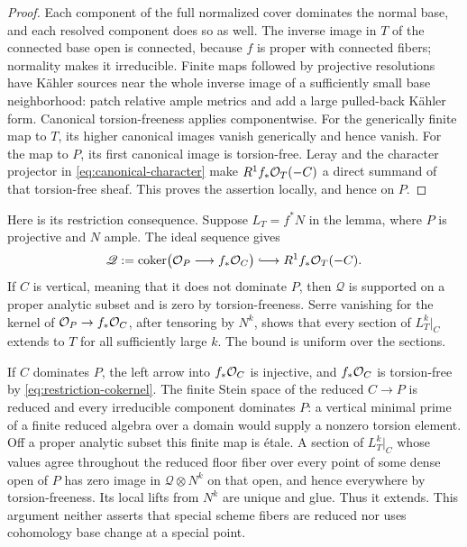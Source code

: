 \begin{proof}
Each component of the full normalized cover dominates the normal base,
and each resolved component does so as well.  The inverse image in \(T\)
of the connected base open is connected, because \(f\) is proper with
connected fibers; normality makes it irreducible.  Finite maps followed by
projective resolutions have K\"ahler sources near the whole inverse image
of a sufficiently small base neighborhood: patch relative ample metrics
and add a large pulled-back K\"ahler form.  Canonical torsion-freeness
\cite[Theorem~2.9 and Proposition~2.11]{Fujino2023AnalyticVanishing}
applies componentwise.  For the generically finite map to \(T\), its
higher canonical images vanish generically and hence vanish.  For the
map to \(P\), its first canonical image is torsion-free.  Leray and the
character projector in \eqref{eq:canonical-character} make
\(R^1f_*\mathcal O_T(-C)\) a direct summand of that torsion-free sheaf.  This
proves the assertion locally, and hence on \(P\).
\end{proof}

Here is its restriction consequence.  Suppose \(L_T=f^*N\) in the lemma,
where \(P\) is projective and \(N\) ample.  The ideal sequence gives
\begin{equation}\label{eq:restriction-cokernel}
 \mathscr Q:=\coker\bigl(\OO_P\longrightarrow f_*\OO_C\bigr)
 \lhook\joinrel\longrightarrow R^1f_*\OO_T(-C).
\end{equation}
If \(C\) is vertical, meaning that it does not dominate \(P\), then
\(\mathscr Q\) is supported on a proper analytic subset and is zero by
torsion-freeness.  Serre vanishing for the kernel of
\(\mathcal O_P\to f_*\mathcal O_C\), after tensoring by \(N^k\), shows that every
section of \(L_T^k|_C\) extends to \(T\) for all sufficiently large \(k\).
The bound is uniform over the sections.

If \(C\) dominates \(P\), the left arrow into \(f_*\mathcal O_C\) is injective,
and \(f_*\mathcal O_C\) is torsion-free by \eqref{eq:restriction-cokernel}.
The finite Stein space of the reduced \(C\to P\) is reduced and every
irreducible component dominates \(P\): a vertical minimal prime of a
finite reduced algebra over a domain would supply a nonzero torsion
element.  Off a proper analytic subset this finite map is \'etale.  A
section of \(L_T^k|_C\) whose values agree throughout the reduced floor
fiber over every point of some dense open of \(P\) has zero image in
\(\mathscr Q\otimes N^k\) on that open,
and hence everywhere by torsion-freeness.  Its local lifts from \(N^k\)
are unique and glue.  Thus it extends.  This argument neither asserts
that special scheme fibers are reduced nor uses cohomology base change at
a special point.

